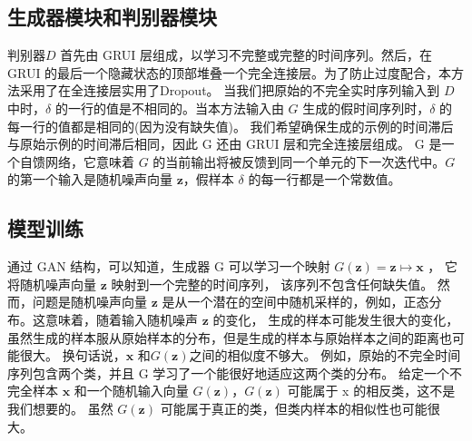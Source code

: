 \subsection{生成器模块和判别器模块}
判别器$D$ 首先由 GRUI 层组成，以学习不完整或完整的时间序列。然后，在 GRUI 的最后一个隐藏状态的顶部堆叠一个完全连接层。为了防止过度配合，本方法采用了在全连接层实用了Dropout。
当我们把原始的不完全实时序列输入到 $D$ 中时，$\delta$  的一行的值是不相同的。当本方法输入由 $G$ 生成的假时间序列时，$\delta$  的每一行的值都是相同的(因为没有缺失值)。
我们希望确保生成的示例的时间滞后与原始示例的时间滞后相同，因此 $\mathrm{G}$ 还由 GRUI 层和完全连接层组成。
$\mathrm{G}$ 是一个自馈网络，它意味着 $G$ 的当前输出将被反馈到同一个单元的下一次迭代中。$G$ 的第一个输入是随机噪声向量 $\boldsymbol{z}$，假样本 $\delta$  的每一行都是一个常数值。

\subsection{模型训练}
通过 GAN 结构，可以知道，生成器 G 可以学习一个映射 $G(\boldsymbol{z})=\boldsymbol{z} \mapsto \boldsymbol{x}$ ，
它将随机噪声向量 $\boldsymbol{z}$ 映射到一个完整的时间序列，
该序列不包含任何缺失值。
然而，问题是随机噪声向量 $\boldsymbol{z}$ 是从一个潜在的空间中随机采样的，例如，正态分布。这意味着，随着输入随机噪声 $\boldsymbol{z}$ 的变化，
生成的样本可能发生很大的变化，虽然生成的样本服从原始样本的分布，但是生成的样本与原始样本之间的距离也可能很大。
换句话说，$\boldsymbol{x}$ 和$G(\boldsymbol{z})$之间的相似度不够大。
例如，原始的不完全时间序列包含两个类，并且 $\mathrm{G}$ 学习了一个能很好地适应这两个类的分布。
给定一个不完全样本 $\boldsymbol{x}$ 和一个随机输入向量 $G(\boldsymbol{z})$，$G(\boldsymbol{z})$ 可能属于 x 的相反类，这不是我们想要的。
虽然 $G(\boldsymbol{z})$ 可能属于真正的类，但类内样本的相似性也可能很大。

